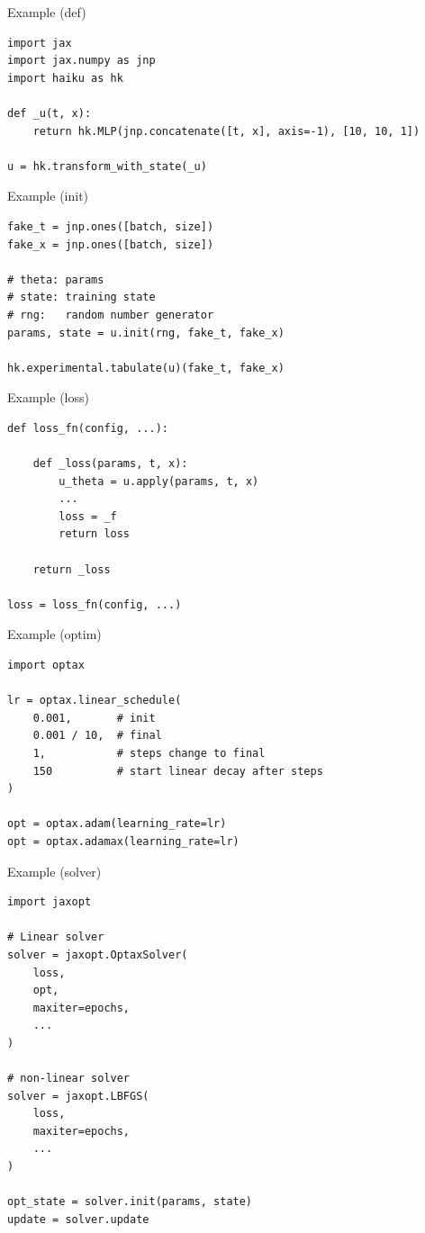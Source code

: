\documentclass[aspectratio=1610,xcolor={dvipsnames},hyperref={colorlinks,unicode,linkcolor=violet,anchorcolor=BlueViolet,citecolor=YellowOrange,filecolor=black,urlcolor=Aquamarine}]{beamer}
\begin{document}
\begin{frame}[label={sec:org7b2516c},fragile,containsverbatim]{Example (def)}
 \begin{verbatim}
import jax
import jax.numpy as jnp
import haiku as hk

def _u(t, x):
    return hk.MLP(jnp.concatenate([t, x], axis=-1), [10, 10, 1])

u = hk.transform_with_state(_u)
\end{verbatim}
\end{frame}

\begin{frame}[label={sec:org787ce60},fragile,containsverbatim]{Example (init)}
 \begin{verbatim}
fake_t = jnp.ones([batch, size])
fake_x = jnp.ones([batch, size])

# theta: params
# state: training state
# rng:   random number generator
params, state = u.init(rng, fake_t, fake_x)

hk.experimental.tabulate(u)(fake_t, fake_x)
\end{verbatim}
\end{frame}

\begin{frame}[label={sec:org536c290},fragile,containsverbatim]{Example (loss)}
 \begin{verbatim}
def loss_fn(config, ...):

    def _loss(params, t, x):
        u_theta = u.apply(params, t, x)
        ...
        loss = _f
        return loss

    return _loss

loss = loss_fn(config, ...)
\end{verbatim}
\end{frame}

\begin{frame}[label={sec:orgfadc2c6},fragile,containsverbatim]{Example (optim)}
 \begin{verbatim}
import optax

lr = optax.linear_schedule(
    0.001,       # init
    0.001 / 10,  # final
    1,           # steps change to final
    150          # start linear decay after steps
)

opt = optax.adam(learning_rate=lr)
opt = optax.adamax(learning_rate=lr)
\end{verbatim}
\end{frame}

\begin{frame}[label={sec:org6984ed2},fragile,containsverbatim]{Example (solver)}
 \begin{verbatim}
import jaxopt

# Linear solver
solver = jaxopt.OptaxSolver(
    loss,
    opt,
    maxiter=epochs,
    ...
)

# non-linear solver
solver = jaxopt.LBFGS(
    loss,
    maxiter=epochs,
    ...
)

opt_state = solver.init(params, state)
update = solver.update
\end{verbatim}
\end{frame}
\end{document}
